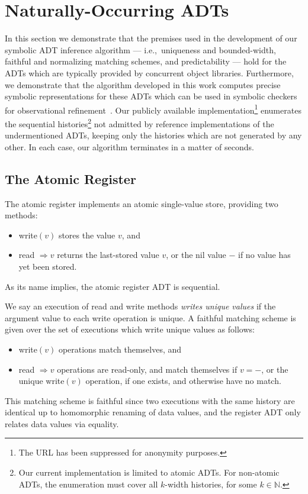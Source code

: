\section{Naturally-Occurring ADTs}
\label{sec:nature}

In this section we demonstrate that the premises used in the development of our
symbolic ADT inference algorithm — i.e.,~uniqueness and bounded-width,
faithful and normalizing matching schemes, and predictability — hold for the
ADTs which are typically provided by concurrent object libraries. Furthermore,
we demonstrate that the algorithm developed in this work computes precise
symbolic representations for these ADTs which can be used in symbolic checkers
for observational refinement~\cite{conf/pldi/EmmiEH15}. Our publicly available
implementation\footnote{The URL has been suppressed for anonymity purposes.}
enumerates the sequential histories\footnote{Our current implementation is
limited to atomic ADTs. For non-atomic ADTs, the enumeration must cover all
$k$-width histories, for some $k \in \mathbb{N}$.} not admitted by reference
implementations of the undermentioned ADTs, keeping only the histories which
are not generated by any other. In each case, our algorithm terminates in a
matter of seconds.

\subsection{The Atomic Register}

The atomic register implements an atomic single-value store, providing two
methods:
\begin{itemize}

  \item write$(v)$ stores the value $v$, and

  \item read $\Rightarrow v$ returns the last-stored value $v$, or the nil
  value $-$ if no value has yet been stored.

\end{itemize}
As its name implies, the atomic register ADT is sequential.

We say an execution of read and write methods \emph{writes unique values} if
the argument value to each write operation is unique. A faithful matching
scheme is given over the set of executions which write unique values as follows:
\begin{itemize}

  \item write$(v)$ operations match themselves, and

  \item read $\Rightarrow v$ operations are read-only, and match themselves if
  $v = -$, or the unique write$(v)$ operation, if one exists, and otherwise
  have no match.

\end{itemize}
This matching scheme is faithful since two executions with the same history
are identical up to homomorphic renaming of data values, and the register ADT
only relates data values via equality.

